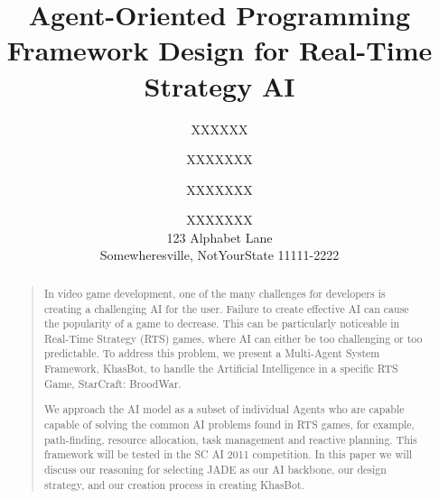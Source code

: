 \documentclass[letterpaper]{article}
\begin{document}
%
\title{Agent-Oriented Programming Framework Design for Real-Time Strategy AI}


\author{XXXXXX \and XXXXXXX \and XXXXXXX \and XXXXXXX \\
123 Alphabet Lane \\  Somewheresville, NotYourState 11111-2222
}


\maketitle
\begin{abstract}
\begin{quote}
In video game development, one of the many challenges for developers is creating a challenging AI for the user.  Failure to create effective AI can cause the popularity of a game to decrease.  This can be particularly noticeable in Real-Time Strategy (RTS) games, where AI can either be too challenging or too predictable.  To address this problem, we present a Multi-Agent System Framework, KhasBot, to handle the Artificial Intelligence in a specific RTS Game, StarCraft: BroodWar. 

 We approach the AI model as a subset of individual Agents who are capable capable of solving the common AI problems found in RTS games, for example, path-finding, resource allocation, task management and reactive planning.  This framework will be tested in the SC AI 2011 competition.  In this paper we will discuss our reasoning for selecting JADE as our AI backbone, our design strategy, and our creation process in creating KhasBot.
\end{quote}
\end{abstract}
\end{document}
